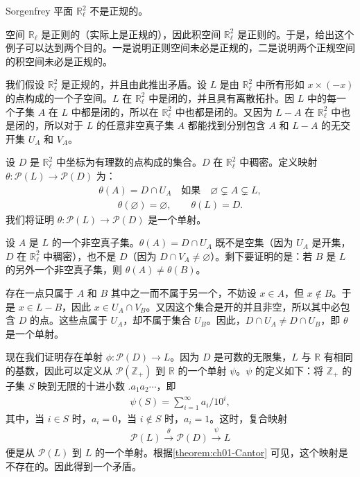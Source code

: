 \begin{example}\label{example:ch04-sorgenfrey-plane-not-normal}
Sorgenfrey 平面 $\mathbb{R}_{\ell}^{2}$ 不是正规的。

空间 $\mathbb{R}_{\ell}$ 是正则的（实际上是正规的），因此积空间 $\mathbb{R}_{\ell}^{2}$ 是正则的。于是，给出这个例子可以达到两个目的。一是说明正则空间未必是正规的，二是说明两个正规空间的积空间未必是正规的。

我们假设 $\mathbb{R}_{\ell}^{2}$ 是正规的，并且由此推出矛盾。设 $L$ 是由 $\mathbb{R}_{\ell}^{2}$ 中所有形如 $x\times(-x)$ 的点构成的一个子空间。$L$ 在 $\mathbb{R}_{\ell}^{2}$ 中是闭的，并且具有离散拓扑。因 $L$ 中的每一个子集 $A$ 在 $L$ 中都是闭的，所以在 $\mathbb{R}_{\ell}^{2}$ 中也都是闭的。又因为 $L-A$ 在 $\mathbb{R}_{\ell}^{2}$ 中也是闭的，所以对于 $L$ 的任意非空真子集 $A$ 都能找到分别包含 $A$ 和 $L-A$ 的无交开集 $U_{A}$ 和 $V_{A}$。

设 $D$ 是 $\mathbb{R}_{\ell}^{2}$ 中坐标为有理数的点构成的集合。$D$ 在 $\mathbb{R}_{\ell}^{2}$ 中稠密。定义映射 $\theta\colon\mathcal{P}(L)\to\mathcal{P}(D)$ 为：
\begin{align*}
\theta(A)=D\cap U_{A}\quad\text{如果}\quad\varnothing\subsetneq A\subsetneq L,
\end{align*}
\begin{align*}
\theta(\varnothing)=\varnothing,\qquad\theta(L)=D.
\end{align*}
我们将证明 $\theta\colon\mathcal{P}(L)\to\mathcal{P}(D)$ 是一个单射。

设 $A$ 是 $L$ 的一个非空真子集。$\theta(A)=D\cap U_{A}$ 既不是空集（因为 $U_{A}$ 是开集，$D$ 在 $\mathbb{R}_{\ell}^{2}$ 中稠密），也不是 $D$（因为 $D\cap V_{A}\neq\varnothing$）。剩下要证明的是：若 $B$ 是 $L$ 的另外一个非空真子集，则 $\theta(A)\neq\theta(B)$。

存在一点只属于 $A$ 和 $B$ 其中之一而不属于另一个，不妨设 $x\in A$，但 $x\notin B$。于是 $x\in L-B$，因此 $x\in U_{A}\cap V_{B}$。又因这个集合是开的并且非空，所以其中必包含 $D$ 的点。这些点属于 $U_{A}$，却不属于集合 $U_{B}$。因此，$D\cap U_{A}\neq D\cap U_{B}$，即 $\theta$ 是一个单射。

现在我们证明存在单射 $\phi\colon\mathcal{P}(D)\to L$。因为 $D$ 是可数的无限集，$L$ 与 $\mathbb{R}$ 有相同的基数，因此可以定义从 $\mathcal{P}(\mathbb{Z}_{+})$ 到 $\mathbb{R}$ 的一个单射 $\psi$。$\psi$ 的定义如下：将 $\mathbb{Z}_{+}$ 的子集 $S$ 映到无限的十进小数 $.a_{1}a_{2}\cdots$，即
\begin{align*}
\psi(S)=\sum_{i=1}^{\infty}a_{i}/10^{i},
\end{align*}
其中，当 $i\in S$ 时，$a_{i}=0$，当 $i\notin S$ 时，$a_{i}=1$。这时，复合映射
\begin{align*}
\mathcal{P}(L)\xrightarrow{\theta}\mathcal{P}(D)\xrightarrow{\psi}L
\end{align*}
便是从 $\mathcal{P}(L)$ 到 $L$ 的一个单射。根据\cref{theorem:ch01-Cantor} 可见，这个映射是不存在的。因此得到一个矛盾。


\end{example}
